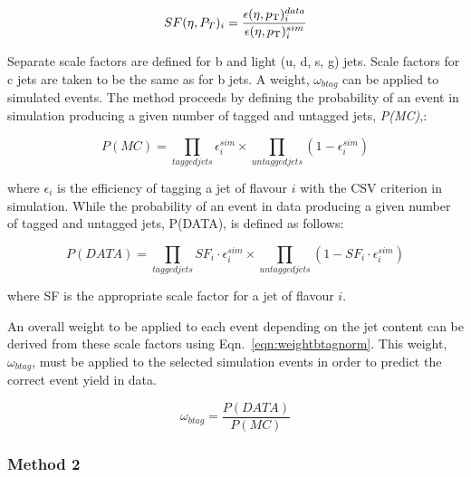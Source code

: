 \begin{centering}
\begin{equation}
SF(\eta, P_{T})_{i} = \frac{\epsilon(\eta , p_{\mathrm{T}})^{data}_{i}}{\epsilon(\eta , p_{\mathrm{T}})^{sim}_{i}}
\label{eqn:sfbtagnorm}
\end{equation}
\end{centering}
Separate scale factors are defined for b and light (u, d, s, g) jets. Scale factors for c jets are taken to be the same as for b jets. A weight, $\omega_{btag}$ can be applied to simulated events. The method proceeds by defining the probability of an event in simulation producing a given number of tagged and untagged jets, \emph{P(MC)},:

\begin{centering}
\begin{equation}
P(MC) = \prod_{tagged jets}\epsilon^{sim}_{i} \times \prod_{untagged jets}(1- \epsilon^{sim}_{i})
\end{equation}
\end{centering}
where $\epsilon_{i}$ is the efficiency of tagging a jet of flavour $i$ with the CSV criterion in simulation. While the probability of an event in data producing a given number of tagged and untagged jets, P(DATA), is defined as follows:


\begin{centering}
\begin{equation}
P(DATA) = \prod_{tagged jets}SF_{i}\cdot\epsilon^{sim}_{i} \times \prod_{untagged jets}(1- SF_{i}\cdot\epsilon^{sim}_{i})
\end{equation}
\end{centering}
where SF is the appropriate scale factor for a jet of flavour $i$. 

An overall weight to be applied to each event depending on the jet content can be derived from these scale factors using Eqn.~\ref{eqn:weightbtagnorm}. This weight, $\omega_{btag}$, must be applied to the selected simulation events in order to predict the correct event yield in data.

\begin{centering}
\begin{equation}
 \omega_{btag} = \frac{P(DATA)}{P(MC)}
 \label{eqn:weightbtagnorm}
\end{equation}
\end{centering}

\subsubsection{Method 2 ~\label{subsec:method2btag}}


